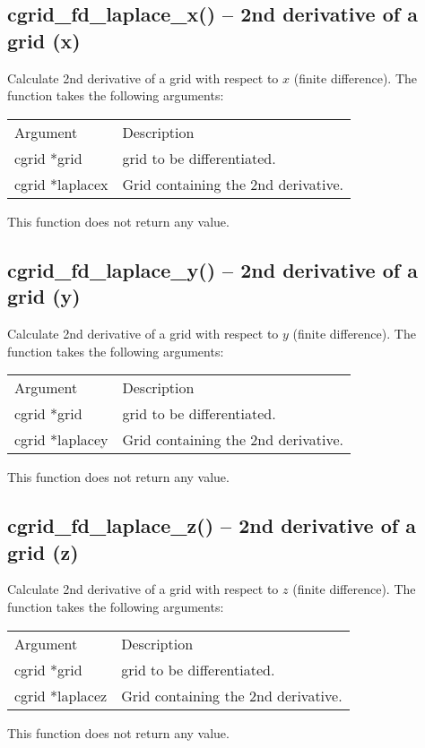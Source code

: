 \documentclass[12pt,letterpaper]{report}
\begin{document}
\subsection{cgrid\_fd\_laplace\_x() -- 2nd derivative of a grid (x)}

Calculate 2nd derivative of a grid with respect to $x$ (finite difference). The function takes the following arguments:
\begin{longtable}{p{} p{}}
Argument & Description\\
\cline{1-2}
cgrid *grid & grid to be differentiated.\\
cgrid *laplacex & Grid containing the 2nd derivative.\\
\end{longtable}
\noindent
This function does not return any value.

\subsection{cgrid\_fd\_laplace\_y() -- 2nd derivative of a grid (y)}

Calculate 2nd derivative of a grid with respect to $y$ (finite difference). The function takes the following arguments:
\begin{longtable}{p{} p{}}
Argument & Description\\
\cline{1-2}
cgrid *grid & grid to be differentiated.\\
cgrid *laplacey & Grid containing the 2nd derivative.\\
\end{longtable}
\noindent
This function does not return any value.

\subsection{cgrid\_fd\_laplace\_z() -- 2nd derivative of a grid (z)}

Calculate 2nd derivative of a grid with respect to $z$ (finite difference). The function takes the following arguments:
\begin{longtable}{p{} p{}}
Argument & Description\\
\cline{1-2}
cgrid *grid & grid to be differentiated.\\
cgrid *laplacez & Grid containing the 2nd derivative.\\
\end{longtable}
\noindent
This function does not return any value.
\end{document}
